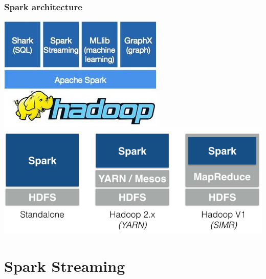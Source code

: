 \documentclass{beamer}
\begin{document}
\begin{frame}
\frametitle{Spark architecture}
\begin{center}
\includegraphics[height=0.4\textheight]{img/SparkHadoop.png}
\vspace{1em}
\includegraphics[height=0.4\textheight]{img/spark-on-hadoop.png}
\end{center}
\end{frame}

\section{Spark Streaming}

\end{document}
